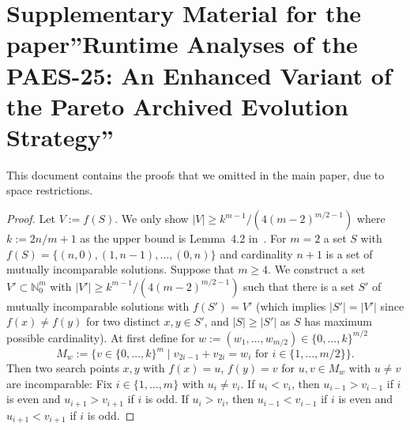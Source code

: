 \documentclass[
sigconf = false, %
review = false, %
screen = true, %
anonymous = true, %
format=acmsmall
]{acmart}
\begin{document}
\balance



\cleardoublepage
\appendix
\onecolumn

\section*{Supplementary Material for the paper''Runtime Analyses of the PAES-25: An Enhanced Variant of
the Pareto Archived Evolution Strategy''}

This document contains the proofs that we omitted in the main paper, due to space restrictions.

\lemfitnessvectors*

\begin{proof}

Let $V:=f(S)$. We only show $\lvert{V}\rvert \geq k^{m-1}/(4(m-2)^{m/2-1})$ where $k:=2n/m+1$ as the upper bound is Lemma~4.2 in~\cite{OprisNSGAIII}. For $m=2$ a set $S$ with $f(S)=\{(n,0),(1,n-1), \ldots , (0,n)\}$ and cardinality $n+1$ is a set of mutually incomparable solutions. Suppose that $m \geq 4$. We construct a set $V' \subset \mathbb{N}_0^m$ with $\lvert{V'}\rvert \geq k^{m-1}/(4(m-2)^{m/2-1})$ such that there is a set $S'$ of mutually incomparable solutions with $f(S') = V'$ (which implies $\lvert{S'}\rvert = \lvert{V'}\rvert$ since $f(x) \neq f(y)$ for two distinct $x,y \in S'$, and $\lvert{S}\rvert \geq \lvert{S'}\rvert$ as $S$ has maximum possible cardinality). At first define for $w:=(w_1, \ldots , w_{m/2}) \in \{0, \ldots , k\}^{m/2}$
\[
M_w:=\{v \in \{0, \ldots, k\}^m \mid v_{2i-1}+v_{2i} = w_i \text{ for }i \in \{1, \ldots ,m/2\}\}.
\]
Then two search points $x,y$ with $f(x)=u$, $f(y)=v$ for $u,v \in M_w$ with $u \neq v$ are incomparable: Fix $i \in \{1, \ldots, m\}$ with $u_i \neq v_i$. If $u_i < v_i$, then $u_{i-1} > v_{i-1}$ if $i$ is even and $u_{i+1} > v_{i+1}$ if $i$ is odd. If $u_i > v_i$, then $u_{i-1} < v_{i-1}$ if $i$ is even and $u_{i+1} < v_{i+1}$ if $i$ is odd. 


\end{proof}
\end{document}

